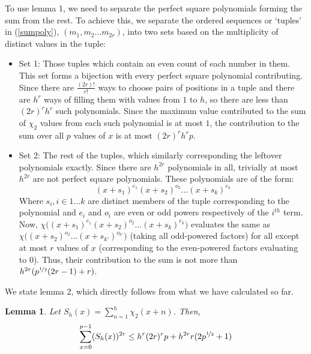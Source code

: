 \documentclass{report}
\newtheorem{lemma}{Lemma}
\begin{document}
To use lemma 1, we need to separate the perfect square polynomials forming the sum from the rest. To achieve this, we separate the ordered sequences or `tuples' in (\ref{sumpoly}), $(m_1, m_2...m_{2r})$, into two sets based on the multiplicity of distinct values in the tuple:
\begin{itemize}
  \item Set 1: Those tuples which contain an even count of each number in them. This set forms a bijection with every perfect square polynomial contributing. Since there are $\frac{(2r)!}{r!}$ ways to choose pairs of positions in a tuple and there are $h^{r}$ ways of filling them with values from $1$ to $h$, so there are less than $(2r)^r h^{r}$ such polynomials. Since the maximum value contributed to the sum of $\chi_2$ values from each such polynomial is at most $1$, the contribution to the sum over all $p$ values of $x$ is at most $(2r)^r h^{r}p$.
  \item Set 2: The rest of the tuples, which similarly corresponding the leftover polynomials exactly. Since there are $h^{2r}$ polynomials in all, trivially at most $h^{2r}$ are not perfect square polynomials. These polynomials are of the form:
  $$(x+s_1)^{e_1}(x+s_2)^{o_2}...(x+s_k)^{e_k}$$
  Where $s_i, i\in 1...k$ are distinct members of the tuple corresponding to the polynomial and $e_i$ and $o_i$ are even or odd powers respectively of the $i^{th}$ term. Now, $\chi\big((x+s_1)^{e_1}(x+s_2)^{o_2}...(x+s_k)^{e_k}\big)$ evaluates the same as $\chi\big((x+s_2)^{o_2}...(x+s_{k'})^{o_{k'}}\big)$ (taking all odd-powered factors) for all except at most $r$ values of $x$ (corresponding to the even-powered factors evaluating to $0$). Thus, their contribution to the sum is not more than $h^{2r}(p^{\nicefrac{1}{2}}(2r-1)+r)$.
\end{itemize}
%
We state lemma 2, which directly follows from what we have calculated so far.
%
\begin{lemma}
Let $S_h(x)=\sum\limits_{n=1}^{h}\chi_2(x+n)$. Then,
\begin{equation} \label{lemma2}
\sum\limits_{x=0}^{p-1}(S_h(x))^{2r}\leq h^{r}(2r)^{r}p+h^{2r}r(2p^{\nicefrac{1}{2}}+1)
\end{equation}
\end{lemma}
\end{document}
